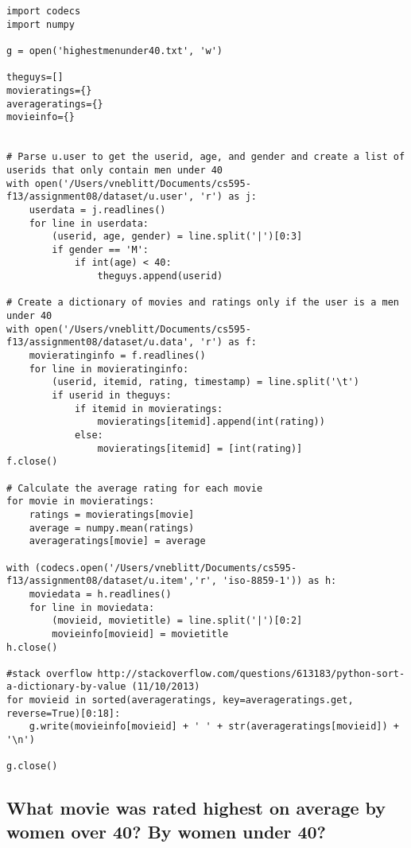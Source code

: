 \documentclass{article}
\begin{document}
\begin{lstlisting}[frame=single, caption=highestmenunder40.py, label=highestmenunder40]
import codecs
import numpy

g = open('highestmenunder40.txt', 'w')

theguys=[]
movieratings={}
averageratings={}
movieinfo={}


# Parse u.user to get the userid, age, and gender and create a list of userids that only contain men under 40
with open('/Users/vneblitt/Documents/cs595-f13/assignment08/dataset/u.user', 'r') as j:
	userdata = j.readlines()
	for line in userdata:
		(userid, age, gender) = line.split('|')[0:3]
		if gender == 'M':
			if int(age) < 40:
				theguys.append(userid)

# Create a dictionary of movies and ratings only if the user is a men under 40
with open('/Users/vneblitt/Documents/cs595-f13/assignment08/dataset/u.data', 'r') as f:
	movieratinginfo = f.readlines()
	for line in movieratinginfo:
		(userid, itemid, rating, timestamp) = line.split('\t')
		if userid in theguys:
			if itemid in movieratings:
				movieratings[itemid].append(int(rating))
			else:
				movieratings[itemid] = [int(rating)]
f.close()

# Calculate the average rating for each movie
for movie in movieratings:
	ratings = movieratings[movie]
	average = numpy.mean(ratings)
	averageratings[movie] = average

with (codecs.open('/Users/vneblitt/Documents/cs595-f13/assignment08/dataset/u.item','r', 'iso-8859-1')) as h:
	moviedata = h.readlines()
	for line in moviedata:
		(movieid, movietitle) = line.split('|')[0:2]
		movieinfo[movieid] = movietitle
h.close()

#stack overflow http://stackoverflow.com/questions/613183/python-sort-a-dictionary-by-value (11/10/2013)
for movieid in sorted(averageratings, key=averageratings.get, reverse=True)[0:18]:
	g.write(movieinfo[movieid] + ' ' + str(averageratings[movieid]) + '\n')

g.close()
\end{lstlisting}

\newpage
\subsection{What movie was rated highest on average by women over 40? By women under 40?}
\end{document}
